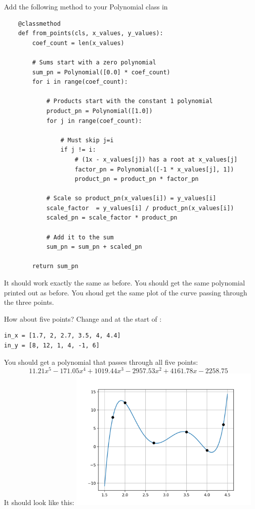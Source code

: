 Add the following method to your Polynomial class in 
\begin{Verbatim}
    @classmethod
    def from_points(cls, x_values, y_values):
        coef_count = len(x_values)

        # Sums start with a zero polynomial
        sum_pn = Polynomial([0.0] * coef_count)
        for i in range(coef_count):

            # Products start with the constant 1 polynomial
            product_pn = Polynomial([1.0])
            for j in range(coef_count):

                # Must skip j=i
                if j != i:
                    # (1x - x_values[j]) has a root at x_values[j]
                    factor_pn = Polynomial([-1 * x_values[j], 1])
                    product_pn = product_pn * factor_pn
                    
            # Scale so product_pn(x_values[i]) = y_values[i]
            scale_factor  = y_values[i] / product_pn(x_values[i])
            scaled_pn = scale_factor * product_pn

            # Add it to the sum
            sum_pn = sum_pn + scaled_pn
            
        return sum_pn  
\end{Verbatim}

It should work exactly the same as before.  You should get the same
polynomial printed out as before. You shoud get the same plot of the
curve passing through the three points.

How about five points? Change  and  at the
start of :
\begin{Verbatim}
in_x = [1.7, 2, 2.7, 3.5, 4, 4.4]
in_y = [8, 12, 1, 4, -1, 6]
\end{Verbatim}

You should get a polynomial that passes through all five points:
\begin{equation*}
11.21x^5 - 171.05x^4 + 1019.44x^3 - 2957.53x^2 + 4161.78x - 2258.75  
\end{equation*}
It should look like this:
\includegraphics[width=0.7\textwidth]{fiveinterp.png}
